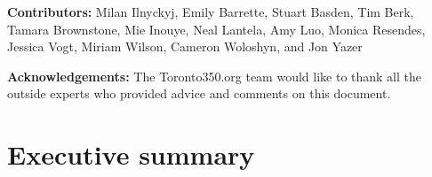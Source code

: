 \documentclass[10pt]{article}
\begin{document}
\vspace{2cm}



\textbf{Contributors:} Milan Ilnyckyj, Emily Barrette, Stuart Basden, Tim Berk, Tamara Brownstone, Mie Inouye, Neal Lantela, Amy Luo, Monica Resendes, Jessica Vogt, Miriam Wilson, Cameron Woloshyn, and Jon Yazer



\vspace{2cm}



\textbf{Acknowledgements:} The Toronto350.org team would like to thank all the outside experts who provided advice and comments on this document.



\clearpage








		\singlespacing
		\section{Executive summary}
		\label{sec:ExecutiveSummary}
		\doublespacing



\end{document}
